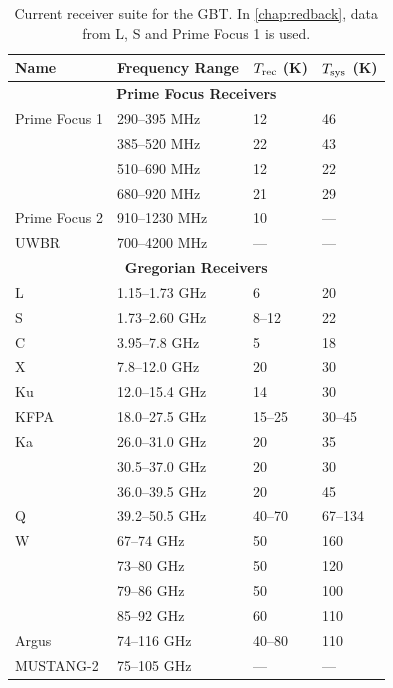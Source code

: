 \begin{table}[htbp]
\centering
\caption{Current receiver suite for the GBT. In \cref{chap:redback}, data from L, S and Prime Focus 1 is used.}
\label{tab:GBTreceivers}
\begin{tabular}{llll}
\hline
\textbf{Name} &
\textbf{Frequency Range} &
\textbf{$T_{\rm rec}$ (K)} &
\textbf{$T_{\rm sys}$ (K)} \\
\hline

\multicolumn{4}{c}{\textbf{Prime Focus Receivers}} \\
\hline

Prime Focus 1 & 290--395 MHz & 12 & 46 \\
              & 385--520 MHz & 22 & 43 \\
              & 510--690 MHz & 12 & 22 \\
              & 680--920 MHz & 21 & 29 \\
Prime Focus 2 & 910--1230 MHz & 10 & --- \\
UWBR          & 700--4200 MHz & --- & --- \\

\hline
\multicolumn{4}{c}{\textbf{Gregorian Receivers}} \\
\hline


L         & 1.15--1.73 GHz & 6 & 20 \\
S         & 1.73--2.60 GHz & 8--12 & 22 \\
C         & 3.95--7.8 GHz  & 5 & 18 \\
X         & 7.8--12.0 GHz  & 20 & 30 \\
Ku        & 12.0--15.4 GHz & 14 & 30 \\
KFPA      & 18.0--27.5 GHz & 15--25 & 30--45 \\
Ka        & 26.0--31.0 GHz & 20 & 35 \\
           & 30.5--37.0 GHz & 20 & 30 \\
           & 36.0--39.5 GHz & 20 & 45 \\
Q         & 39.2--50.5 GHz & 40--70 & 67--134 \\
W         & 67--74 GHz     & 50 & 160 \\
           & 73--80 GHz     & 50 & 120 \\
           & 79--86 GHz     & 50 & 100 \\
           & 85--92 GHz     & 60 & 110 \\
Argus     & 74--116 GHz    & 40--80 & 110 \\
MUSTANG-2 & 75--105 GHz    & --- & --- \\

\hline
\end{tabular}
\end{table}

